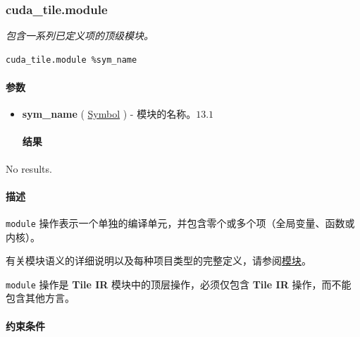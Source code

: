 \documentclass{article}
\begin{document}
\subsubsection{cuda\_tile.module}

\textit{包含一系列已定义项的顶级模块。}


\begin{lstlisting}
cuda_tile.module %sym_name
\end{lstlisting}

\paragraph{参数}

\begin{itemize}
\item \textbf{sym\_name} ( \href{https://docs.nvidia.com/cuda/tile-ir/latest/sections/operations.html#type-symbol}{Symbol} ) - 模块的名称。$\boxed{13.1}$


\paragraph{结果}

\end{itemize}
No results.



\paragraph{描述}

\texttt{module} 操作表示一个单独的编译单元，并包含零个或多个项（全局变量、函数或内核）。


有关模块语义的详细说明以及每种项目类型的完整定义，请参阅\href{https://docs.nvidia.com/cuda/tile-ir/latest/sections/semantics.html#sub-sec-modules}{模块}。


\texttt{module} 操作是 \textbf{Tile IR} 模块中的顶层操作，必须仅包含 \textbf{Tile IR} 操作，而不能包含其他方言。



\paragraph{约束条件}
\end{document}
